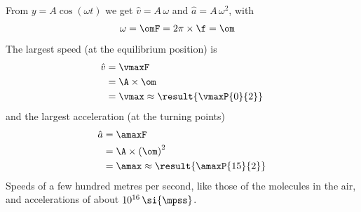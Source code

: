From $y = A\cos(\omega t)$ we get $\hat v = A\,\omega$ and $\hat a = A\,\omega^2$, with
\begin{align}
 \omega &= \omF = 2\pi\times\f = \om
\end{align}
The largest speed (at the equilibrium position) is
\begin{align}
 \hat v &= \vmaxF \\
   &= \A\times\om \\
   &= \vmax \approx \result{\vmaxP{0}{2}}
\end{align}
and the largest acceleration (at the turning points)
\begin{align}
 \hat a &= \amaxF \\
   &= \A\times\left(\om\right)^2 \\
   &= \amax \approx \result{\amaxP{15}{2}}
\end{align}
Speeds of a few hundred metres per second, like those of the molecules in the air, and accelerations of about $10^{16}\,\si{\mpss}$.
